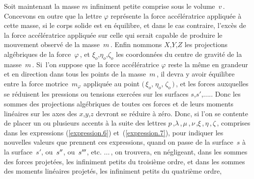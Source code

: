 \documentclass[11pt, twoside, leqno]{article}
\renewcommand{\eqref}[1]{(\ref{#1})}
\begin{document}
Soit maintenant la masse \;$m$\; infiniment petite comprise sous le volume~\;$v$\,.\hspace{.5ex} Concevons en outre que la lettre \;$\varphi$\; représente la force accélératrice appliquée à cette masse, si le corps solide est en équilibre, et dans le cas contraire, l'excès de la force accélératrice appliquée sur celle qui serait capable de produire le mouvement observé de la masse~\;$m$\,.\hspace{.5ex} Enfin nommons \hbox{\;$X$,\;$Y$,\;$Z$\;} les projections algébriques de la force~\;$\varphi$\,,\hspace{.6ex} et \hbox{\;$\xi_o$,\;$\eta_o$,\;$\zeta_o$\;} les coordonnées du centre de gravité de la masse~\;$m$\,.\hspace{.5ex} Si~l'on suppose que la force accélératrice \;$\varphi$\; reste la même en grandeur et en direction dans tous les points de la masse~\;$m$\,,\hspace{.6ex} il devra y avoir équilibre entre la force motrice~\;$m_{\varphi}$\; appliquée au point \hbox{\;$\bigl(\, \xi_o\text{,}\;\eta_o\text{,}\;\zeta_o \,\bigr)$\,},\hspace{.5ex} et les forces auxquelles se réduisent les pressions ou tensions exercées sur les surfaces \hbox{\;$s$,\:$s'$,\:.\hspace{.2ex}.\hspace{.2ex}.\hspace{.2ex}.\hspace{.2ex}.\;} Donc les sommes des projections algébriques de toutes ces forces et de leurs moments linéaires sur les axes des \;$x$,\:$y$,\:$z$\; devront se réduire à zéro. Donc, si l'on se contente de placer un ou plusieurs accents à la suite des lettres \hbox{\;$p$\,,\:\:$\lambda$\,,\:\,$\mu$\,,\:\,$\nu$\,,\:\;$\xi$\,,\:\,$\eta$\,,\:\,$\zeta$\,},\hspace{.5ex} comprises dans les expressions \eqref{expression.6} et~\eqref{expression.7}, pour indiquer les nouvelles valeurs que prennent ces expressions, quand on passe de la surface~\:$s$\hspace{.7ex} à la surface~\:$s'$,\hspace{.5ex} ou \,$s'\kern-0.2ex'$,\hspace{.5ex} ou \,$s'\kern-0.2ex'\kern-0.2ex'$,\hspace{.5ex} etc. .\hspace{.1ex}.\hspace{.1ex}.\,, on trouvera, en négligeant, dans les sommes des forces projetées, les infiniment petits du troisième ordre, et dans les sommes des moments linéaires projetés, les infiniment petits du quatrième ordre,
\end{document}

